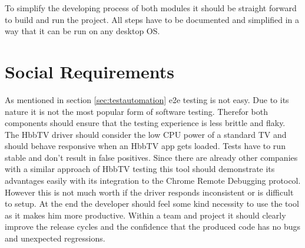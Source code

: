 To simplify the developing process of both modules it should be straight forward to build and run the project. All steps have to be documented and simplified in a way that it can be run on any desktop OS.

\section{Social Requirements\label{sec:socreq}}

As mentioned in section \ref{sec:testautomation} e2e testing is not easy. Due to its nature it is not the most popular form of software testing. Therefor both components should ensure that the testing experience is less brittle and flaky. The HbbTV driver should consider the low CPU power of a standard TV and should behave responsive when an HbbTV app gets loaded. Tests have to run stable and don't result in false positives. Since there are already other companies with a similar approach of HbbTV testing this tool should demonstrate its advantages easily with its integration to the Chrome Remote Debugging protocol. However this is not much worth if the driver responds inconsistent or is difficult to setup. At the end the developer should feel some kind necessity to use the tool as it makes him more productive. Within a team and project it should clearly improve the release cycles and the confidence that the produced code has no bugs and unexpected regressions.
